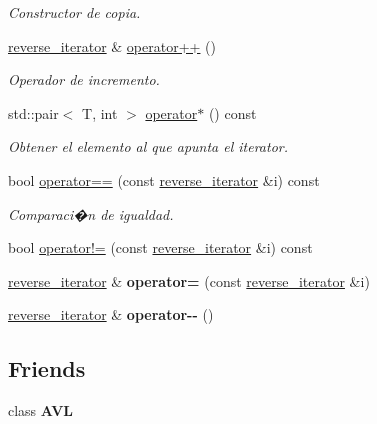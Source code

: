\begin{DoxyCompactItemize}
\begin{DoxyCompactList}\small\item\em Constructor de copia. \end{DoxyCompactList}\item 
\hyperlink{classAVL_1_1reverse__iterator}{reverse\-\_\-iterator} \& \hyperlink{classAVL_1_1reverse__iterator_ad12f49da125255ca7dfc465afd504316}{operator++} ()
\begin{DoxyCompactList}\small\item\em Operador de incremento. \end{DoxyCompactList}\item 
std\-::pair$<$ T, int $>$ \hyperlink{classAVL_1_1reverse__iterator_a6d4e7d86a2b72992a729b10ea818db26}{operator$\ast$} () const 
\begin{DoxyCompactList}\small\item\em Obtener el elemento al que apunta el iterator. \end{DoxyCompactList}\item 
bool \hyperlink{classAVL_1_1reverse__iterator_aa9f78719fd65e47b95b324bddce6c33c}{operator==} (const \hyperlink{classAVL_1_1reverse__iterator}{reverse\-\_\-iterator} \&i) const 
\begin{DoxyCompactList}\small\item\em Comparaci�n de igualdad. \end{DoxyCompactList}\item 
bool \hyperlink{classAVL_1_1reverse__iterator_ad70e491e8ccf8f59bf9b34bc9fa1b67a}{operator!=} (const \hyperlink{classAVL_1_1reverse__iterator}{reverse\-\_\-iterator} \&i) const 
\item 
\hypertarget{classAVL_1_1reverse__iterator_a435f307ec7c2a0a4d4d5d2f1274a8ba5}{\hyperlink{classAVL_1_1reverse__iterator}{reverse\-\_\-iterator} \& {\bfseries operator=} (const \hyperlink{classAVL_1_1reverse__iterator}{reverse\-\_\-iterator} \&i)}\label{classAVL_1_1reverse__iterator_a435f307ec7c2a0a4d4d5d2f1274a8ba5}

\item 
\hypertarget{classAVL_1_1reverse__iterator_a6d763e43dac6c3a089c2275c2253e51d}{\hyperlink{classAVL_1_1reverse__iterator}{reverse\-\_\-iterator} \& {\bfseries operator-\/-\/} ()}\label{classAVL_1_1reverse__iterator_a6d763e43dac6c3a089c2275c2253e51d}

\end{DoxyCompactItemize}
\subsection*{Friends}
\begin{DoxyCompactItemize}
\item 
\hypertarget{classAVL_1_1reverse__iterator_acba9d79a1cae18f44a9bf4aa4d0de787}{class {\bfseries A\-V\-L}}\label{classAVL_1_1reverse__iterator_acba9d79a1cae18f44a9bf4aa4d0de787}

\end{DoxyCompactItemize}


